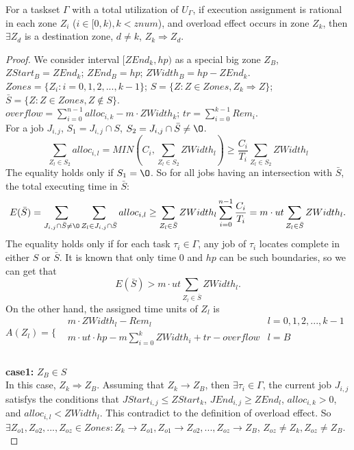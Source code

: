 \documentclass{article}
\begin{document}
\begin{lemm}
	For a taskset $\Gamma$ with a total utilization of $U_\Gamma$, 
	if execution assignment is rational in each zone $Z_i$ ($i \in [0, k), k < znum$), 
	and overload effect occurs in zone $Z_k$, 
	then $\exists Z_d$ is a destination zone, $d \ne k$, $Z_k \Rightarrow Z_d$.
\end{lemm}

\begin{proof}
	We consider interval $[ZEnd_k, hp)$ as a special big zone $Z_B$, $ZStart_B = ZEnd_k$; $ZEnd_B = hp$; $ZWidth_B = hp - ZEnd_k$. \\ 
	$Zones = \{ Z_i : i = 0,1,2,...,k-1 \}$; $S = \{ Z : Z \in Zones, Z_k \Rightarrow Z\}$; $\bar{S} = \{ Z : Z \in Zones, Z \notin S \}$. \\ 
	$overflow = \sum\limits_{i=0}^{n-1} alloc_{i,k} - m \cdot ZWidth_k$;
	$tr = \sum\limits_{i=0}^{k-1} Rem_i$. \\
	For a job $J_{i,j}$, $S_1 = J_{i,j} \cap S$, $S_2 = J_{i,j} \cap \bar{S} \neq \O$. 
	\[
		\sum\limits_{Z_l \in S_2} alloc_{i,l} = MIN(C_i, \sum\limits_{Z_l \in S_2} ZWidth_l) \geq \dfrac{C_i}{T_i} \sum\limits_{Z_l \in S_2} ZWidth_l	
	\]
	The equality holds only if $S_1 = \O$.
	So for all jobs having an intersection with $\bar{S}$, the total executing time in $\bar{S}$:
	\[
		E(\bar{S}) = \sum\limits_{J_{i,j} \cap \bar{S} \neq \O} \sum\limits_{Z_l \in J_{i,j} \cap \bar{S}} alloc_{i,l} \geq \sum\limits_{Z_l \in \bar{S}} ZWidth_l \sum\limits_{i=0}^{n-1} \dfrac{C_i}{T_i}
		= m \cdot ut \sum\limits_{Z_l \in \bar{S}} ZWidth_l.
	\]
	The equality holds only if for each task $\tau_i \in \Gamma$, any job of $\tau_i$ locates complete in either $S$ or $\bar{S}$. It is known that only time $0$ and $hp$ can be such boundaries, so we can get that
	\begin{equation}
		E(\bar{S}) > m \cdot ut \sum\limits_{Z_l \in \bar{S}} ZWidth_l \label{exp1}.
	\end{equation}
	On the other hand, the assigned time units of $Z_l$ is 
	\[
		A(Z_l) = \{
			\begin{aligned}
				& m \cdot ZWidth_l - Rem_l & l = 0, 1, 2, ..., k-1 & \\
				& m \cdot ut \cdot hp - m \sum\limits_{i=0}^{k} ZWidth_i + tr -overflow & l = B & \\
			\end{aligned}
	\]
		\\
	\textbf{case1:} $Z_B \in S$\\
	In this case, $Z_k \Rightarrow Z_B$. 
	Assuming that $Z_k \to Z_B$, then $\exists \tau_i \in \Gamma$, the current job $J_{i,j}$ satisfys the conditions that $JStart_{i,j} \leq ZStart_k$, $JEnd_{i,j} \geq ZEnd_l$, $alloc_{i,k} > 0$, and $alloc_{i,l}<ZWidth_l$. This contradict to the definition of overload effect. So $\exists Z_{o1}, Z_{o2}, ..., Z_{oz} \in Zones : Z_k \to Z_{o1}, Z_{o1} \to Z_{o2}, ..., Z_{oz} \to Z_B$, $Z_{oz} \neq Z_k, Z_{oz} \neq Z_B$.  \\

\end{proof}
\end{document}
